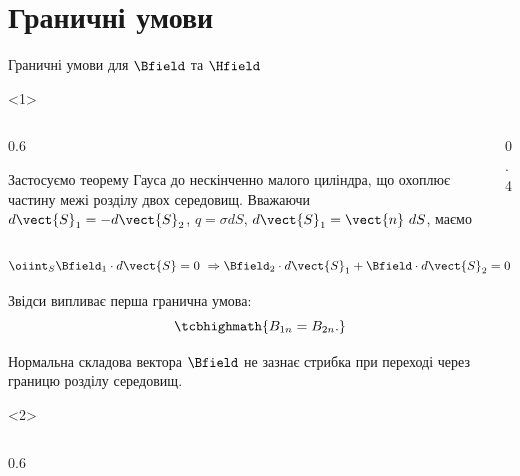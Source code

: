 \documentclass[onlytextwidth]{beamer}
\begin{document}
\section{Граничні умови}






\begin{frame}{Граничні умови для $\Bfield$ та $\Hfield$}{}
	\begin{onlyenv}
		\begin{columns}
			\begin{column}{0.6\linewidth}
				\begin{block}{}\justifying
					Застосуємо теорему Гауса до нескінченно малого циліндра, що охоплює частину межі
					розділу двох
					середовищ. Вважаючи $d\vect{S}_1 = - d\vect{S}_2$, $q = \sigma dS$,
					$d\vect{S}_1 =
						\vect{n}\ dS$,
					маємо
				\end{block}
			\end{column}
			\begin{column}{0.4\linewidth}\centering
				
			\end{column}
		\end{columns}
		\begin{block}{}
			\begin{equation*}
				\oiint_S \Bfield_1\cdot d\vect{S} = 0\ \Rightarrow  \Bfield_2\cdot
				d\vect{S}_1 +
				\Bfield\cdot d\vect{S}_2 = 0
			\end{equation*}
		\end{block}
		\begin{block}{}
			Звідси випливає перша гранична умова:
			\begin{equation*}
				\tcbhighmath{
					B_{1n} = B_{2n}.
				}
			\end{equation*}
		\end{block}
		\begin{alertblock}{}\centering
			Нормальна складова вектора $\Bfield$ не зазнає стрибка при
			переході через границю розділу середовищ.
		\end{alertblock}
	\end{onlyenv}
	\begin{onlyenv}
		\begin{columns}
			\begin{column}{0.6\linewidth}
				\begin{block}{}\justifying

\end{block}
\end{column}
\end{columns}
\end{onlyenv}
\end{frame}
\end{document}
